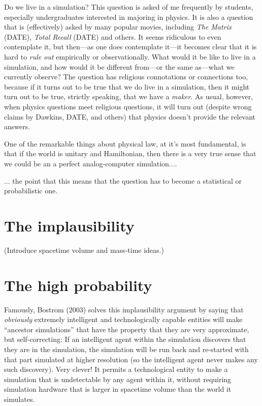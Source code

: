 \documentclass[12pt,letterpaper]{article}
\begin{document}
Do we live in a simulation? This question is asked of me frequently by
students, especially undergraduates interested in majoring in physics.
It is also a question that is (effectively) asked by many popular
movies, including \textit{The Matrix} (DATE), \textit{Total Recall}
(DATE) and others.
It seems ridiculous to even contemplate it, but then---as one does
contemplate it---it becomes clear that it is hard to \emph{rule out}
empirically or observationally.
What would it be like to live in a simulation, and how would it be
different from---or the same as---what we currently observe?
The question has religious connotations or connections too, because if
it turns out to be true that we do live in a simulation, then it might
turn out to be true, strictly speaking, that we have a \emph{maker}.
As usual, however, when physics questions meet religious questions, it
will turn out (despite wrong claims by Dawkins, DATE, and others) that
physics doesn't provide the relevant answers.

One of the remarkable things about physical law, at it's most fundamental,
is that if the world is unitary and Hamiltonian, then there is a very
true sense that we could be an a perfect analog-computer simulation....

... the point that this means that the question has to become a
statistical or probabilistic one.

\section{The implausibility}

(Introduce spacetime volume and mass-time ideas.)

\section{The high probability}

Famously, Bostrom (2003) solves this implausibility argument by saying
that \emph{obviously} extremely intelligent and technologically
capable entities will make ``ancestor simulations'' that have the
property that they are very approximate, but self-correcting: If an
intelligent agent within the simulation discovers that they are in the
simulation, the simulation will be run back and re-started with that
part simulated at higher resolution (so the intelligent agent never
makes any such discovery). Very clever! It permits a technological entity
to make a simulation that is undetectable by any agent within it, without
requiring simulation hardware that is larger in spacetime volume than
the world it simulates.
\end{document}
